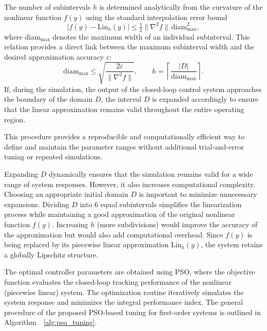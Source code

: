 \documentclass[preprint,12pt]{elsarticle}
\begin{document}
The number of subintervals \(h\) is determined analytically from the curvature of the nonlinear function \(f(y)\) using the standard interpolation error bound
\[
|f(y) - \mathrm{Lin}_h(y)| \le \tfrac{1}{2}\|\nabla^2 f\| \, \mathrm{diam}^2_{\max},
\]
where \(\mathrm{diam}_{\max}\) denotes the maximum width of an individual subinterval. This relation provides a direct link between the maximum subinterval width and the desired approximation accuracy \(\varepsilon\):
\[
\mathrm{diam}_{\max} \le \sqrt{\frac{2\varepsilon}{\|\nabla^2 f\|}}, \qquad
h = \left\lceil \frac{|D|}{\mathrm{diam}_{\max}} \right\rceil.
\]
If, during the simulation, the output of the closed-loop control system approaches the boundary of the domain \(D\), the interval \(D\) is expanded accordingly to ensure that the linear approximation remains valid throughout the entire operating region.  

This procedure provides a reproducible and computationally efficient way to define and maintain the parameter ranges without additional trial-and-error tuning or repeated simulations.

Expanding \( D \) dynamically ensures that the simulation remains valid for a wide range of system responses. However, it also increases computational complexity. Choosing an appropriate initial domain \( D \) is important to minimize unnecessary expansions. Dividing \( D \) into 6 equal subintervals simplifies the linearization process while maintaining a good approximation of the original nonlinear function \( f(y) \). Increasing \( h \) (more subdivisions) would improve the accuracy of the approximation but would also add computational overhead.
Since \( f(y) \) is being replaced by its piecewise linear approximation \( \text{Lin}_h(y) \), the system retains a globally Lipschitz structure.

The optimal controller parameters are obtained using PSO, where the objective function evaluates the closed-loop tracking performance of the nonlinear (piecewise linear) system. The optimization routine iteratively simulates the system response and minimizes the integral performance index. The general procedure of the proposed PSO-based tuning for first-order systems is outlined in Algorithm~~\ref{alg:pso_tuning}.
\end{document}
